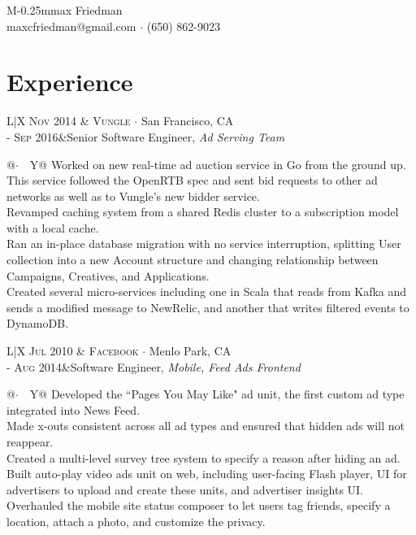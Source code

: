 \documentclass[a4paper,11pt]{article}
\begin{document}
\pagestyle{empty}
\begin{center}

\Huge{M\kern-0.25mmax Friedman}\\
\normalsize maxcfriedman@gmail.com $\cdot$ (650) 862-9023

\vspace{-5mm}

\section{Experience}
\begin{tabular}{L|X}
  \small\textsc{Nov 2014} & \large\textsc{Vungle} $\cdot$ \normalsize San Francisco, CA \\
  \small\textsc{- Sep 2016}&\small{Senior Software Engineer, \emph{Ad Serving Team}}\newline
  \bgroup
  \def\arraystretch{1.5}
  \begin{tabular}[t]{@{$\cdot$~~}Y@{}}
    Worked on new real-time ad auction service in Go from the ground up. This service followed the OpenRTB spec and sent bid requests to other ad networks as well as to Vungle's new bidder service.\\
    Revamped caching system from a shared Redis cluster to a subscription model with a local cache.\\
    Ran an in-place database migration with no service interruption, splitting User collection into a new Account structure and changing relationship between Campaigns, Creatives, and Applications.\\
    Created several micro-services including one in Scala that reads from Kafka and sends a modified message to NewRelic, and another that writes filtered events to DynamoDB.
  \end{tabular}
  \egroup
\end{tabular}

\vspace{10pt}
\begin{tabular}{L|X}
  \small\textsc{Jul 2010} & \large\textsc{Facebook} $\cdot$ \normalsize Menlo Park, CA \\
  \small\textsc{- Aug 2014}&\small{Software Engineer, \emph{Mobile, Feed Ads Frontend}}\newline
  \bgroup
  \def\arraystretch{1.5}
  \begin{tabular}[t]{@{$\cdot$~~}Y@{}}
    Developed the ``Pages You May Like" ad unit, the first custom ad type integrated into News Feed.\\
    Made x-outs consistent across all ad types and ensured that hidden ads will not reappear.\\
    Created a multi-level survey tree system to specify a reason after hiding an ad.\\
    Built auto-play video ads unit on web, including user-facing Flash player, UI for advertisers to upload and create these units, and advertiser insights UI.\\
    Overhauled the mobile site status composer to let users tag friends, specify a location, attach a photo, and customize the privacy.
  \end{tabular}
  \egroup
\end{tabular}


\end{center}
\end{document}
